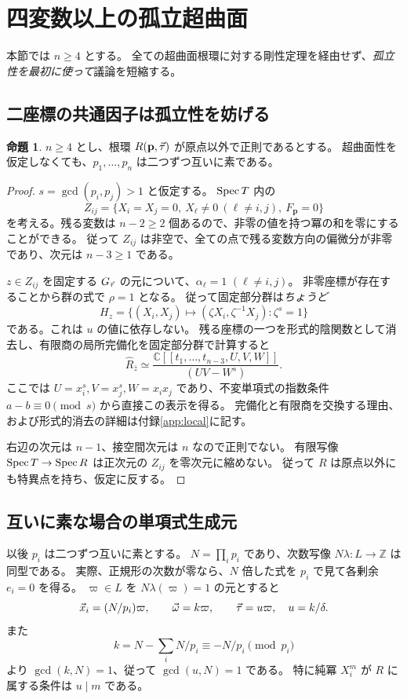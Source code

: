 \documentclass[11pt,a4paper]{ltjsarticle}
\numberwithin{equation}{section}
\theoremstyle{definition}
\newtheorem{proposition}[theorem]{命題}
\newcommand{\Z}{\mathbb Z}\newcommand{\N}{\mathbb N}\newcommand{\Q}{\mathbb Q}\newcommand{\C}{\mathbb C}
\newcommand{\bp}{\mathbf p}\newcommand{\bw}{\mathbf w}\newcommand{\one}{\mathbf 1}
\begin{document}
\section{四変数以上の孤立超曲面}\label{sec:higher}
本節では $n\ge4$ とする。
全ての超曲面根環に対する剛性定理を経由せず、\emph{孤立性を最初に使って}議論を短縮する。

\subsection{二座標の共通因子は孤立性を妨げる}
\begin{proposition}\label{prop:pairwise}
$n\ge4$ とし、根環 $R(\bp,\ta)$ が原点以外で正則であるとする。
超曲面性を仮定しなくても、$p_1,\dots,p_n$ は二つずつ互いに素である。
\end{proposition}
\begin{proof}
$s=\gcd(p_i,p_j)>1$ と仮定する。
$\operatorname{Spec} T$ 内の
\[
 Z_{ij}=\{X_i=X_j=0,\ X_\ell\ne0\ (\ell\ne i,j),\ F_{\bp}=0\}
\]
を考える。残る変数は $n-2\ge2$ 個あるので、非零の値を持つ冪の和を零にすることができる。
従って $Z_{ij}$ は非空で、全ての点で残る変数方向の偏微分が非零であり、次元は $n-3\ge1$ である。

$z\in Z_{ij}$ を固定する $G_{\vec\tau}$ の元について、$\alpha_\ell=1$ $(\ell\ne i,j)$。
非零座標が存在することから群の式で $\rho=1$ となる。
従って固定部分群は\emph{ちょうど}
\[
 H_z=\{(X_i,X_j)\longmapsto(\zeta X_i,\zeta^{-1}X_j):\zeta^s=1\}
\]
である。これは $u$ の値に依存しない。
残る座標の一つを形式的陰関数として消去し、有限商の局所完備化を固定部分群で計算すると
\begin{equation}\label{eq:localquotient}
 \widehat{R}_{\bar z}\simeq
 \frac{\C[[t_1,\dots,t_{n-3},U,V,W]]}{(UV-W^s)}.
\end{equation}
ここでは $U=x_i^s,V=x_j^s,W=x_ix_j$ であり、不変単項式の指数条件 $a-b\equiv0\pmod s$ から直接この表示を得る。
完備化と有限商を交換する理由、および形式的消去の詳細は付録\ref{app:local}に記す。

右辺の次元は $n-1$、接空間次元は $n$ なので正則でない。
有限写像 $\operatorname{Spec} T\to\operatorname{Spec} R$ は正次元の $Z_{ij}$ を零次元に縮めない。
従って $R$ は原点以外にも特異点を持ち、仮定に反する。
\end{proof}

\subsection{互いに素な場合の単項式生成元}
以後 $p_i$ は二つずつ互いに素とする。
$N=\prod_i p_i$ であり、次数写像 $N\lambda:L\to\Z$ は同型である。
実際、正規形の次数が零なら、$N$ 倍した式を $p_i$ で見て各剰余 $e_i=0$ を得る。
$\varpi\in L$ を $N\lambda(\varpi)=1$ の元とすると
\[
 \vec x_i=(N/p_i)\varpi,\qquad \vec\omega=k\varpi,
 \qquad\vec\tau=u\varpi,\quad u=k/\delta.
\]
また
\begin{equation}\label{eq:coprimek}
 k=N-\sum_iN/p_i\equiv-N/p_i\pmod{p_i}
\end{equation}
より $\gcd(k,N)=1$、従って $\gcd(u,N)=1$ である。
特に純冪 $X_i^m$ が $R$ に属する条件は $u\mid m$ である。
\end{document}
